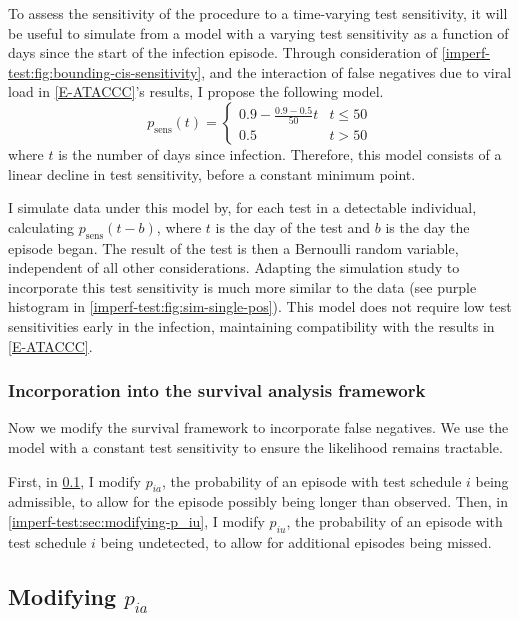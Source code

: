 \documentclass[12pt, letterpaper]{article} %
\newcommand{\psens}{p_\text{sens}}
\begin{document}
To assess the sensitivity of the procedure to a time-varying test sensitivity, it will be useful to simulate from a model with a varying test sensitivity as a function of days since the start of the infection episode.
Through consideration of \cref{imperf-test:fig:bounding-cis-sensitivity}, and the interaction of false negatives due to viral load in \cref{E-ATACCC}'s results, I propose the following model.
\begin{equation}
  p_\text{sens}(t) = \begin{cases}
    0.9 - \frac{0.9-0.5}{50}t &t \leq 50 \\
    0.5 &t > 50
  \end{cases}
  \label{imperf-test:eq:variable-test-sensitivity}
\end{equation}
where $t$ is the number of days since infection.
Therefore, this model consists of a linear decline in test sensitivity, before a constant minimum point.

I simulate data under this model by, for each test in a detectable individual, calculating $\psens(t-b)$, where $t$ is the day of the test and $b$ is the day the episode began.
The result of the test is then a Bernoulli random variable, independent of all other considerations.
Adapting the simulation study to incorporate this test sensitivity is much more similar to the data (see purple histogram in \cref{imperf-test:fig:sim-single-pos}).
This model does not require low test sensitivities early in the infection, maintaining compatibility with the results in \cref{E-ATACCC}.

\subsubsection{Incorporation into the survival analysis framework}

Now we modify the survival framework to incorporate false negatives.
We use the model with a constant test sensitivity to ensure the likelihood remains tractable.

First, in \cref{imperf-test:sec:modifying-p_ia}, I modify $p_{ia}$, the probability of an episode with test schedule $i$ being admissible, to allow for the episode possibly being longer than observed.
Then, in \cref{imperf-test:sec:modifying-p_iu}, I modify $p_{iu}$, the probability of an episode with test schedule $i$ being undetected, to allow for additional episodes being missed.

\subsection{Modifying \texorpdfstring{$p_{ia}$}{pia}} \label{imperf-test:sec:modifying-p_ia}
\end{document}
